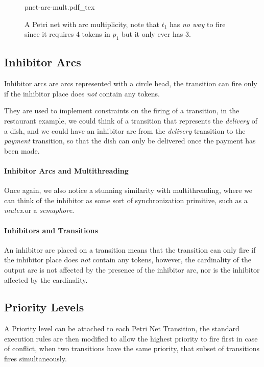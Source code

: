 \documentclass[openright, twoside, twocolumn]{report}
\newcommand{\incsvg}[2]{%
	\def\svgwidth{\columnwidth}
	{#2.pdf_tex}%
}
\begin{document}
    \begin{figure}[ht]
	\centering
	\incsvg{fig}{pnet-arc-mult}\\
	\caption{A Petri net with arc multiplicity, note that $ t_1$ has \emph{no way} to fire since it requires
  4 tokens in $ p_1$ but it only ever has $3$. }
	\label{fig:pnet-arc-mult}
\end{figure}

    \subsection{Inhibitor Arcs}
    Inhibitor arcs are arcs represented with a circle head, the transition can fire only if the inhibitor place
    does \emph{not} contain any tokens.

    They are used to implement constraints on the firing of a transition, in the restaurant example, we
    could think of a transition that represents the \emph{delivery} of a dish, and we could have an inhibitor
    arc from the \emph{delivery} transition to the \emph{payment} transition, so that the dish can only be
    delivered once the payment has been made.


    \paragraph{Inhibitor Arcs and Multithreading}
    Once again, we also notice a stunning similarity with multithreading, where we can think of the inhibitor
    as some sort of synchronization primitive, such as a \emph{mutex}.or a \emph{semaphore}.

    \paragraph{Inhibitors and Transitions}
    An inhibitor arc placed on a transition means that the transition can only fire if the inhibitor place
    does \emph{not} contain any tokens, however, the cardinality of the output arc is not affected by the
    presence of the inhibitor arc, nor is the inhibitor affected by the cardinality.

    \subsection{Priority Levels}

    A Priority level can be attached to each Petri Net Transition, the standard execution rules are then modified
    to allow the highest priority to fire first in case of conflict, when two transitions have the same priority,
    that subset of transitions fires simultaneously.
\end{document}
